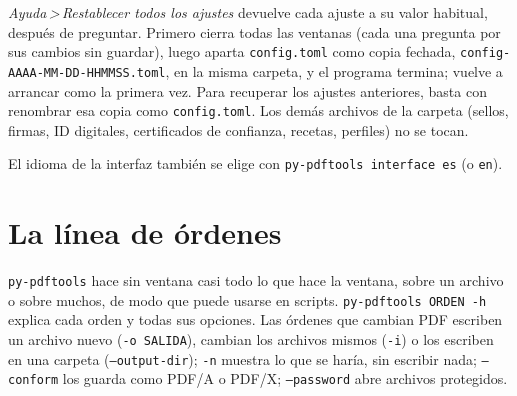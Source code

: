 \documentclass[12pt,
              article,
              oneside
              ]{memoir}
\newcommand*{\menu}[1]{\textit{#1}}
\newcommand*{\then}{\,>\,}
\begin{document}
%
\menu{Ayuda\then Restablecer todos los ajustes} devuelve cada ajuste a su
valor habitual, después de preguntar. Primero cierra todas las ventanas
(cada una pregunta por sus cambios sin guardar), luego aparta
\texttt{config.toml} como copia fechada,
\texttt{config-AAAA-MM-DD-HHMMSS.toml}, en la misma carpeta, y el programa
termina; vuelve a arrancar como la primera vez. Para recuperar los ajustes
anteriores, basta con renombrar esa copia como \texttt{config.toml}. Los
demás archivos de la carpeta (sellos, firmas, ID digitales, certificados
de confianza, recetas, perfiles) no se tocan.

%
El idioma de la interfaz también se elige con
\texttt{py-pdftools interface es} (o \texttt{en}).

\section{La línea de órdenes}
\label{sec:cli}

%
\texttt{py-pdftools} hace sin ventana casi todo lo que hace la ventana,
sobre un archivo o sobre muchos, de modo que puede usarse en scripts.
\texttt{py-pdftools ORDEN -h} explica cada orden y todas sus opciones. Las
órdenes que cambian PDF escriben un archivo nuevo (\texttt{-o SALIDA}),
cambian los archivos mismos (\texttt{-i}) o los escriben en una carpeta
(\texttt{--output-dir}); \texttt{-n} muestra lo que se haría, sin escribir
nada; \texttt{--conform} los guarda como PDF/A o PDF/X;
\texttt{--password} abre archivos protegidos.
\end{document}
